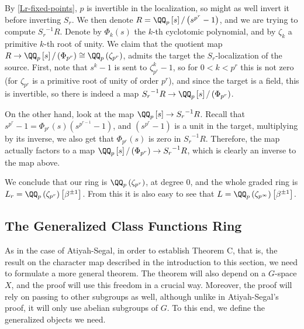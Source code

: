 \begin{example}
	By \ref{Lr-fixed-points}, $p$ is invertible in the localization, so might as well invert it before inverting $S_r$.
	We then denote $R = \QQ_p\left[s\right]/\left(s^{p^r} - 1\right)$, and we are trying to compute ${S_r}^{-1} R$.
	Denote by $\Phi_k\left(s\right)$ the $k$-th cyclotomic polynomial, and by $\zeta_k$ a primitive $k$-th root of unity.
	We claim that the quotient map $R \to \QQ_p\left[s\right]/\left(\Phi_{p^r}\right) \cong \QQ_p\left(\zeta_{p^r}\right)$, admits the target the $S_r$-localization of the source.
	First, note that $s^k-1$ is sent to $\zeta_{p^r}^k - 1$, so for $0 < k < p^r$ this is not zero (for $\zeta_{p^r}$ is a primitive root of unity of order $p^r$), and since the target is a field, this is invertible, so there is indeed a map ${S_r}^{-1} R \to \QQ_p\left[s\right]/\left(\Phi_{p^r}\right)$.
	
	On the other hand, look at the map $\QQ_p\left[s\right] \to {S_r}^{-1} R$.
	Recall that $s^{p^r} - 1 = \Phi_{p^r}\left(s\right) \left(s^{p^{r-1}} - 1\right)$, and $\left(s^{p^r} - 1\right)$ is a unit in the target, multiplying by its inverse, we also get that $\Phi_{p^r}\left(s\right)$ is zero in ${S_r}^{-1} R$.
	Therefore, the map actually factors to a map $\QQ_p\left[s\right]/\left(\Phi_{p^r}\right) \to {S_r}^{-1} R$, which is clearly an inverse to the map above.
	
	We conclude that our ring is $\QQ_p\left(\zeta_{p^r}\right)$, at degree $0$, and the whole graded ring is $L_r = \QQ_p\left(\zeta_{p^r}\right)\left[\beta^{\pm 1}\right]$.
	From this it is also easy to see that $L = \QQ_p\left(\zeta_{p^\infty}\right)\left[\beta^{\pm 1}\right]$.
\end{example}



\subsection{The Generalized Class Functions Ring}

As in the case of Atiyah-Segal, in order to establish Theorem C, that is, the result on the character map described in the introduction to this section, we need to formulate a more general theorem.
The theorem will also depend on a $G$-space $X$, and the proof will use this freedom in a crucial way.
Moreover, the proof will rely on passing to other subgroups as well, although unlike in Atiyah-Segal's proof, it will only use abelian subgroups of $G$.
To this end, we define the generalized objects we need.


